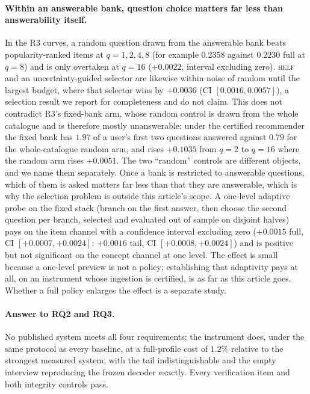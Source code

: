 \documentclass[manuscript,screen,review]{acmart}
\begin{document}
\paragraph{Within an answerable bank, question choice matters far less than answerability itself.} In the R3 curves, a random question drawn from the answerable bank beats popularity-ranked items at $q{=}1,2,4,8$ (for example $0.2358$ against $0.2230$ full at $q{=}8$) and is only overtaken at $q{=}16$ ($+0.0022$, interval excluding zero). \textsc{helf} and an uncertainty-guided selector are likewise within noise of random until the largest budget, where that selector wins by $+0.0036$ (CI $[0.0016,0.0057]$), a selection result we report for completeness and do not claim. This does not contradict R3's fixed-bank arm, whose random control is drawn from the whole catalogue and is therefore mostly unanswerable: under the certified recommender the fixed bank has $1.97$ of a user's first two questions answered against $0.79$ for the whole-catalogue random arm, and rises $+0.1035$ from $q{=}2$ to $q{=}16$ where the random arm rises $+0.0051$. The two ``random'' controls are different objects, and we name them separately. Once a bank is restricted to answerable questions, which of them is asked matters far less than that they are answerable, which is why the selection problem is outside this article's scope. A one-level adaptive probe on the fixed stack (branch on the first answer, then choose the second question per branch, selected and evaluated out of sample on disjoint halves) pays on the item channel with a confidence interval excluding zero ($+0.0015$ full, CI $[+0.0007,+0.0024]$; $+0.0016$ tail, CI $[+0.0008,+0.0024]$) and is positive but not significant on the concept channel at one level. The effect is small because a one-level preview is not a policy; establishing that adaptivity pays at all, on an instrument whose ingestion is certified, is as far as this article goes. Whether a full policy enlarges the effect is a separate study.

\paragraph{Answer to RQ2 and RQ3.} No published system meets all four requirements; the instrument does, under the same protocol as every baseline, at a full-profile cost of $1.2\%$ relative to the strongest measured system, with the tail indistinguishable and the empty interview reproducing the frozen decoder exactly. Every verification item and both integrity controls pass.
\end{document}
